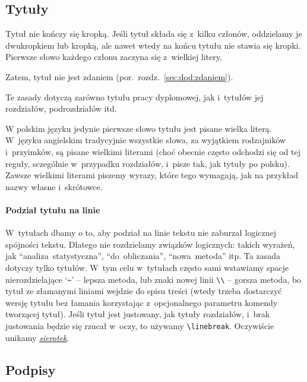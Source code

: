 \subsection{Tytuły}
\label{sec:dod:tytul}

Tytuł nie kończy się kropką. Jeśli tytuł składa się z~kilku członów, oddzielamy je dwukropkiem lub kropką, ale nawet wtedy na końcu tytułu nie stawia się kropki. Pierwsze słowo każdego członu zaczyna się z~wielkiej litery.

Zatem, tytuł nie jest zdaniem (por.~rozdz.~\ref{sec:dod:zdaniem}).

Te zasady dotyczą zarówno tytułu pracy dyplomowej, jak i~tytułów jej rozdziałów, podrozdziałów itd.

W polskim języku jedynie pierwsze słowo tytułu jest pisane wielka literą. W~języku angielskim tradycyjnie wszystkie słowa, za wyjątkiem rodzajników i~przyimków, są pisane wielkimi literami (choć obecnie często odchodzi się od tej reguły, sczególnie w~przypadku rozdziałów, i~pisze tak, jak tytuły po polsku). Zawsze wielkimi literami piszemy wyrazy, które tego wymagają, jak na przykład nazwy własne i~skrótowce.


\paragraph{Podział tytułu na linie}
\label{sec:dod:tytul-podzial}
W~tytułach dbamy o to, aby podział na linie tekstu nie zaburzał logicznej spójności tekstu. Dlatego nie rozdzielamy związków logicznych: takich wyrażeń, jak ``analiza~statystyczna'', ``do~obliczania'', ``nowa~metoda'' itp. Ta zasada dotyczy tylko tytułów. W~tym celu w~tytułach często sami wstawiamy spacje nierozdzielające `{\tt \~{}}' -- lepsza metoda, lub znaki nowej linii \verb+\\+ -- gorsza metoda, bo tytuł ze złamanymi liniami wejdzie do spisu treści (wtedy trzeba dostarczyć wersję tytułu bez łamania korzystając z~opcjonalnego parametru komendy tworzącej tytuł). Jeśli tytuł jest justowany, jak tytuły rozdziałów, i~brak justowania będzie się rzucał w~oczy, to używamy \verb+\linebreak+. Oczywiście unikamy \hyperref[sec:dod:sierotki]{\em sierotek}.


\subsection{Podpisy}
\label{sec:dod:podpis}

